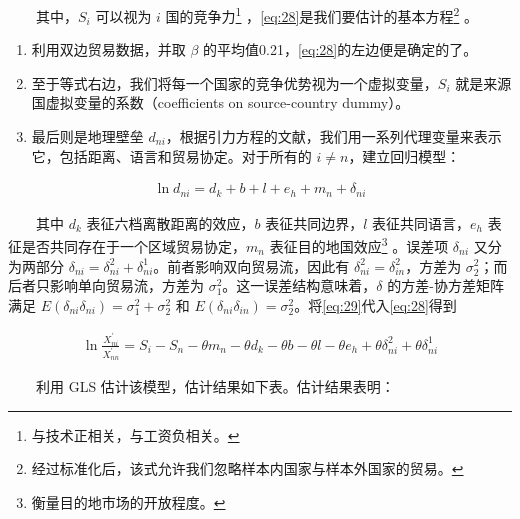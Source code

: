 \documentclass[]{article}
\providecommand{\tightlist}{%
  \setlength{\itemsep}{0pt}\setlength{\parskip}{0pt}}
\let\rmarkdownfootnote\footnote%
\def\footnote{\protect\rmarkdownfootnote}
\begin{document}
　　其中，\(S_i\) 可以视为 \(i\) 国的竞争力\footnote{与技术正相关，与工资负相关。} ，\eqref{eq:28}是我们要估计的基本方程\footnote{经过标准化后，该式允许我们忽略样本内国家与样本外国家的贸易。} 。

\begin{enumerate}
\def\labelenumi{\arabic{enumi}.}
\tightlist
\item
  利用双边贸易数据，并取 \(\beta\) 的平均值0.21，\eqref{eq:28}的左边便是确定的了。\\
\item
  至于等式右边，我们将每一个国家的竞争优势视为一个虚拟变量，\(S_i\) 就是来源国虚拟变量的系数（coefficients on source-country dummy）。\\
\item
  最后则是地理壁垒 \(d_{ni}\)，根据引力方程的文献，我们用一系列代理变量来表示它，包括距离、语言和贸易协定。对于所有的 \(i \neq n\)，建立回归模型：
\end{enumerate}

\begin{align}
\ln d_{n i}=d_{k}+b+l+e_{h}+m_{n}+\delta_{n i} \label{eq:29}
\end{align}

　　其中 \(d_k\) 表征六档离散距离的效应，\(b\) 表征共同边界，\(l\) 表征共同语言，\(e_h\) 表征是否共同存在于一个区域贸易协定，\(m_n\) 表征目的地国效应\footnote{衡量目的地市场的开放程度。} 。误差项 \(\delta_{n i}\) 又分为两部分 \(\delta_{n i} = \delta_{ni}^2 + \delta_{ni}^1\)。前者影响双向贸易流，因此有 \(\delta_{ni}^2=\delta_{in}^2\)，方差为 \(\sigma_2^2\)；而后者只影响单向贸易流，方差为 \(\sigma_1^2\)。这一误差结构意味着，\(\delta\) 的方差-协方差矩阵满足 \(E(\delta_{ni}\delta_{ni})=\sigma_1^2+\sigma_2^2\) 和 \(E(\delta_{ni}\delta_{in})=\sigma_2^2\)。将\eqref{eq:29}代入\eqref{eq:28}得到

\begin{align}
\ln \frac{X_{n i}^{\prime}}{X_{n n}^{\prime}}=S_{i}-S_{n}-\theta m_{n}-\theta d_{k}-\theta b-\theta l-\theta e_{h}+\theta \delta_{n i}^{2}+\theta \delta_{n i}^{1} \label{eq:30}
\end{align}

　　利用 GLS 估计该模型，估计结果如下表。估计结果表明：
\end{document}
